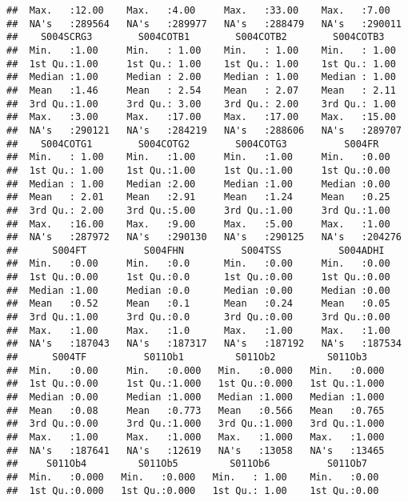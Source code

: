 \documentclass[
]{article}
\begin{document}
\begin{verbatim}
##  Max.   :12.00    Max.   :4.00     Max.   :33.00    Max.   :7.00    
##  NA's   :289564   NA's   :289977   NA's   :288479   NA's   :290011  
##    S004SCRG3        S004COTB1        S004COTB2        S004COTB3     
##  Min.   :1.00     Min.   : 1.00    Min.   : 1.00    Min.   : 1.00   
##  1st Qu.:1.00     1st Qu.: 1.00    1st Qu.: 1.00    1st Qu.: 1.00   
##  Median :1.00     Median : 2.00    Median : 1.00    Median : 1.00   
##  Mean   :1.46     Mean   : 2.54    Mean   : 2.07    Mean   : 2.11   
##  3rd Qu.:1.00     3rd Qu.: 3.00    3rd Qu.: 2.00    3rd Qu.: 1.00   
##  Max.   :3.00     Max.   :17.00    Max.   :17.00    Max.   :15.00   
##  NA's   :290121   NA's   :284219   NA's   :288606   NA's   :289707  
##    S004COTG1        S004COTG2        S004COTG3          S004FR      
##  Min.   : 1.00    Min.   :1.00     Min.   :1.00     Min.   :0.00    
##  1st Qu.: 1.00    1st Qu.:1.00     1st Qu.:1.00     1st Qu.:0.00    
##  Median : 1.00    Median :2.00     Median :1.00     Median :0.00    
##  Mean   : 2.01    Mean   :2.91     Mean   :1.24     Mean   :0.25    
##  3rd Qu.: 2.00    3rd Qu.:5.00     3rd Qu.:1.00     3rd Qu.:1.00    
##  Max.   :16.00    Max.   :9.00     Max.   :5.00     Max.   :1.00    
##  NA's   :287972   NA's   :290130   NA's   :290125   NA's   :204276  
##      S004FT          S004FHN          S004TSS          S004ADHI     
##  Min.   :0.00     Min.   :0.0      Min.   :0.00     Min.   :0.00    
##  1st Qu.:0.00     1st Qu.:0.0      1st Qu.:0.00     1st Qu.:0.00    
##  Median :1.00     Median :0.0      Median :0.00     Median :0.00    
##  Mean   :0.52     Mean   :0.1      Mean   :0.24     Mean   :0.05    
##  3rd Qu.:1.00     3rd Qu.:0.0      3rd Qu.:0.00     3rd Qu.:0.00    
##  Max.   :1.00     Max.   :1.0      Max.   :1.00     Max.   :1.00    
##  NA's   :187043   NA's   :187317   NA's   :187192   NA's   :187534  
##      S004TF          S011Ob1         S011Ob2         S011Ob3     
##  Min.   :0.00     Min.   :0.000   Min.   :0.000   Min.   :0.000  
##  1st Qu.:0.00     1st Qu.:1.000   1st Qu.:0.000   1st Qu.:1.000  
##  Median :0.00     Median :1.000   Median :1.000   Median :1.000  
##  Mean   :0.08     Mean   :0.773   Mean   :0.566   Mean   :0.765  
##  3rd Qu.:0.00     3rd Qu.:1.000   3rd Qu.:1.000   3rd Qu.:1.000  
##  Max.   :1.00     Max.   :1.000   Max.   :1.000   Max.   :1.000  
##  NA's   :187641   NA's   :12619   NA's   :13058   NA's   :13465  
##     S011Ob4         S011Ob5         S011Ob6          S011Ob7     
##  Min.   :0.000   Min.   :0.000   Min.   : 1.00    Min.   :0.00   
##  1st Qu.:0.000   1st Qu.:0.000   1st Qu.: 1.00    1st Qu.:0.00   

\end{verbatim}
\end{document}
